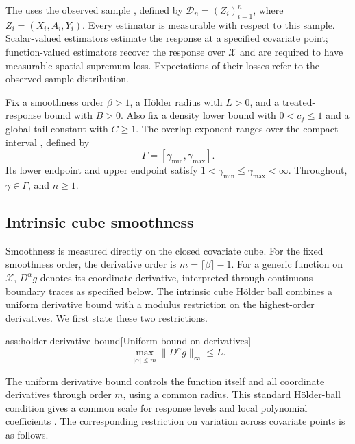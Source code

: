 The  uses the observed sample , defined by \(\mathcal D_n=(Z_i)_{i=1}^n\), where \(Z_i=(X_i,A_i,Y_i)\). Every estimator is measurable with respect to this sample. Scalar-valued estimators estimate the response at a specified covariate point; function-valued estimators recover the response over \(\mathcal X\) and are required to have measurable spatial-supremum loss. Expectations of their losses refer to the observed-sample distribution.

Fix a smoothness order \(\beta>1\), a Hölder radius  with \(L>0\), and a treated-response bound  with \(B>0\). Also fix a density lower bound  with \(0<c_f\le1\) and a global-tail constant  with \(C\ge1\). The overlap exponent ranges over the compact interval , defined by
\[
\Gamma=[\gamma_{\min},\gamma_{\max}].
\]
Its lower endpoint  and upper endpoint  satisfy \(1<\gamma_{\min}\le\gamma_{\max}<\infty\). Throughout, \(\gamma\in\Gamma\), and \(n\ge1\).

\subsection{Intrinsic cube smoothness}

Smoothness is measured directly on the closed covariate cube. For the fixed smoothness order, the derivative order  is \(m=\lceil\beta\rceil-1\). For a generic function  on \(\mathcal X\), \(D^\alpha g\) denotes its coordinate derivative, interpreted through continuous boundary traces as specified below. The intrinsic cube Hölder ball  combines a uniform derivative bound with a modulus restriction on the highest-order derivatives. We first state these two restrictions.

\begin{assumptionv}{ass:holder-derivative-bound}[Uniform bound on derivatives]
\[
\max_{|\alpha|\le m}\|D^\alpha g\|_\infty\le L.
\]
\end{assumptionv}

The uniform derivative bound controls the function itself and all coordinate derivatives through order \(m\), using a common radius. This standard Hölder-ball condition gives a common scale for response levels and local polynomial coefficients \citep{Dorn2026GlobalOverlap}. The corresponding restriction on variation across covariate points is as follows.

